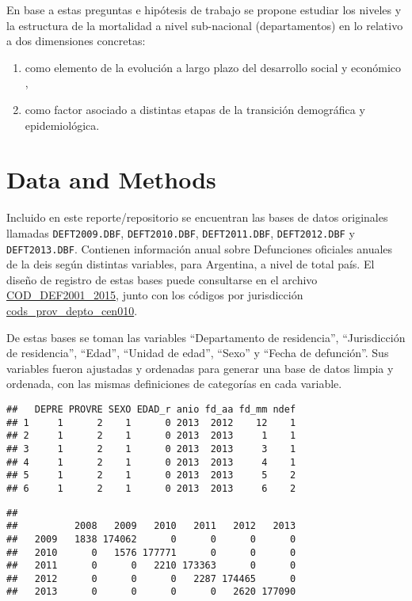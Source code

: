 \documentclass[12pt,spanish,]{article}
\providecommand{\tightlist}{%
  \setlength{\itemsep}{0pt}\setlength{\parskip}{0pt}}
\begin{document}
En base a estas preguntas e hipótesis de trabajo se propone estudiar los
niveles y la estructura de la mortalidad a nivel sub-nacional
(departamentos) en lo relativo a dos dimensiones concretas:

\begin{enumerate}
\def\labelenumi{\alph{enumi})}
\tightlist
\item
  como elemento de la evolución a largo plazo del desarrollo social y
  económico ,
\item
  como factor asociado a distintas etapas de la transición demográfica y
  epidemiológica.
\end{enumerate}

\hypertarget{sec:dat}{%
\section{Data and Methods}\label{sec:dat}}

Incluido en este reporte/repositorio se encuentran las bases de datos
originales llamadas \texttt{DEFT2009.DBF}, \texttt{DEFT2010.DBF},
\texttt{DEFT2011.DBF}, \texttt{DEFT2012.DBF} y \texttt{DEFT2013.DBF}.
Contienen información anual sobre Defunciones oficiales anuales de la
\gls{deis} según distintas variables, para Argentina, a nivel de total
país. El diseño de registro de estas bases puede consultarse en el
archivo
\href{../analysis/data/deis/COD_DEF2001_2015.xls}{COD\_DEF2001\_2015},
junto con los códigos por jurisdicción
\href{../analysis/data/deis/cods_prov_depto_cen010.xls}{cods\_prov\_depto\_cen010}.

De estas bases se toman las variables \enquote{Departamento de
residencia}, \enquote{Jurisdicción de residencia}, \enquote{Edad},
\enquote{Unidad de edad}, \enquote{Sexo} y \enquote{Fecha de defunción}.
Sus variables fueron ajustadas y ordenadas para generar una base de
datos limpia y ordenada, con las mismas definiciones de categorías en
cada variable.

\begin{verbatim}
##   DEPRE PROVRE SEXO EDAD_r anio fd_aa fd_mm ndef
## 1     1      2    1      0 2013  2012    12    1
## 2     1      2    1      0 2013  2013     1    1
## 3     1      2    1      0 2013  2013     3    1
## 4     1      2    1      0 2013  2013     4    1
## 5     1      2    1      0 2013  2013     5    2
## 6     1      2    1      0 2013  2013     6    2
\end{verbatim}

\begin{verbatim}
##       
##          2008   2009   2010   2011   2012   2013
##   2009   1838 174062      0      0      0      0
##   2010      0   1576 177771      0      0      0
##   2011      0      0   2210 173363      0      0
##   2012      0      0      0   2287 174465      0
##   2013      0      0      0      0   2620 177090
\end{verbatim}
\end{document}
